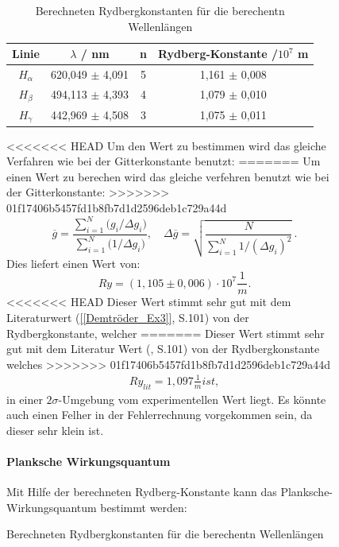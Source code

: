 \begin{figure}
\begin{table}[htbp]
    \centering
    \begin{tabular}{|c|c|c|c|}
        Linie & $\lambda$ / nm & n & Rydberg-Konstante /$10^7$ m \\
        \hline
        $H_\alpha$ & 620,049 $\pm$ 4,091 & 5 & 1,161 $\pm$ 0,008 \\
        $H_\beta$ & 494,113 $\pm$ 4,393 & 4 & 1,079 $\pm$ 0,010  \\
        $H_\gamma$ & 442,969 $\pm$ 4,508 & 3 & 1,075 $\pm$ 0,011 \\
    \end{tabular}
    \caption{Berechneten Rydbergkonstanten für die berechentn Wellenlängen}
    \label{tab:Rydberg}
\end{table}

<<<<<<< HEAD
Um den Wert zu bestimmen wird das gleiche Verfahren wie bei der Gitterkonstante benutzt:
=======
Um einen Wert zu berechen wird das gleiche verfehren benutzt wie bei der Gitterkonstante:
>>>>>>> 01f17406b5457fd1b8fb7d1d2596deb1c729a44d
\begin{equation}
  \overline{g}
  = \frac{\sum_{i=1}^{N} \bigl(g_i/\Delta g_i\bigr)}
         {\sum_{i=1}^{N} \bigl(1/\Delta g_i\bigr)},
  \quad
  \Delta\overline{g}
  = \sqrt{\frac{N}{\sum_{i=1}^{N} 1/(\Delta g_i)^{2}}}\,.
\end{equation}
Dies liefert einen Wert von:
\begin{equation}
    Ry = (1,105 \pm 0,006)\cdot 10^7 \frac{1}{m}.
\end{equation}
<<<<<<< HEAD
Dieser Wert stimmt sehr gut mit dem Literaturwert (\cref{[Demtröder_Ex3]}, S.101) von der Rydbergkonstante, welcher
=======
Dieser Wert stimmt sehr gut mit dem Literatur Wert (\cite{Demtröder_Ex3}, S.101) von der Rydbergkonstante welches 
>>>>>>> 01f17406b5457fd1b8fb7d1d2596deb1c729a44d
\begin{align}
    Ry_{lit} = 1,097 \frac{1}{m} ist,
\end{align}
in einer $2\sigma$-Umgebung vom experimentellen Wert liegt.
Es könnte auch einen Felher in der Fehlerrechnung vorgekommen sein, da dieser sehr klein ist.

\paragraph{Planksche Wirkungsquantum}

Mit Hilfe der berechneten Rydberg-Konstante kann das Planksche-Wirkungsquantum bestimmt werden:


\end{figure}
